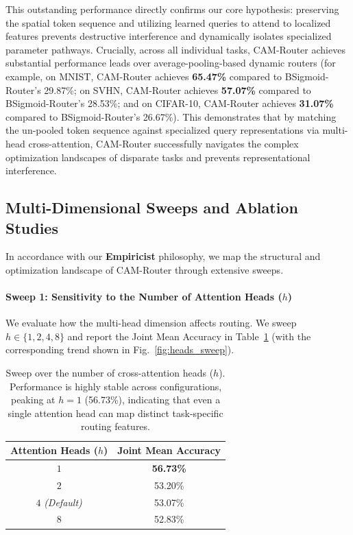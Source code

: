 This outstanding performance directly confirms our core hypothesis: preserving the spatial token sequence and utilizing learned queries to attend to localized features prevents destructive interference and dynamically isolates specialized parameter pathways. Crucially, across all individual tasks, CAM-Router achieves substantial performance leads over average-pooling-based dynamic routers (for example, on MNIST, CAM-Router achieves \textbf{65.47\%} compared to BSigmoid-Router's 29.87\%; on SVHN, CAM-Router achieves \textbf{57.07\%} compared to BSigmoid-Router's 28.53\%; and on CIFAR-10, CAM-Router achieves \textbf{31.07\%} compared to BSigmoid-Router's 26.67\%). This demonstrates that by matching the un-pooled token sequence against specialized query representations via multi-head cross-attention, CAM-Router successfully navigates the complex optimization landscapes of disparate tasks and prevents representational interference.

\subsection{Multi-Dimensional Sweeps and Ablation Studies}
In accordance with our \textbf{Empiricist} philosophy, we map the structural and optimization landscape of CAM-Router through extensive sweeps.

\paragraph{Sweep 1: Sensitivity to the Number of Attention Heads ($h$)}
We evaluate how the multi-head dimension affects routing. We sweep $h \in \{1, 2, 4, 8\}$ and report the Joint Mean Accuracy in Table~\ref{tab:sweep_heads} (with the corresponding trend shown in Fig.~\ref{fig:heads_sweep}). 

\begin{table}[h]
\centering
\caption{Sweep over the number of cross-attention heads ($h$). Performance is highly stable across configurations, peaking at $h=1$ (56.73\%), indicating that even a single attention head can map distinct task-specific routing features.}
\label{tab:sweep_heads}
\vskip 0.1in
\begin{small}
\begin{tabular}{cc}
\toprule
\textbf{Attention Heads ($h$)} & \textbf{Joint Mean Accuracy} \\
\midrule
$1$ & \textbf{56.73\%} \\
$2$ & 53.20\% \\
$4$ \textit{(Default)} & 53.07\% \\
$8$ & 52.83\% \\
\bottomrule
\end{tabular}
\end{small}
\end{table}

